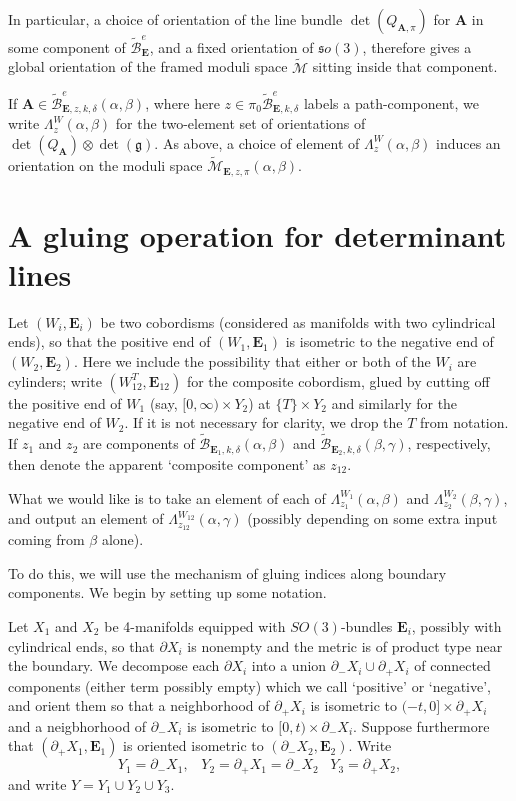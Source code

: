\documentclass{memo-l}
\theoremstyle{definition}
\theoremstyle{remark}
\numberwithin{section}{chapter}
\numberwithin{equation}{chapter}
\begin{document}
In particular, a choice of orientation of the line bundle $\det(Q_{\mathbf{A},\pi})$ for $\mathbf{A}$ in some component of $\widetilde{\mathcal B}^e_{\mathbf{E}}$, and a fixed orientation of $\mathfrak so(3)$, therefore gives a global orientation of the framed moduli space $\widetilde{\mathcal M}$ sitting inside that component.

If $\mathbf{A} \in \widetilde{\mathcal B}^e_{\mathbf{E},z,k,\delta}(\alpha, \beta)$, where here $z \in \pi_0 \widetilde{\mathcal B}^e_{\mathbf{E}, k, \delta}$ labels a path-component, we write $\Lambda^W_z(\alpha, \beta)$ for the two-element set of orientations of $\det(Q_{\mathbf{A}}) \otimes \det(\mathfrak g)$. As above, a choice of element of $\Lambda^W_z(\alpha, \beta)$ induces an orientation on the moduli space $\widetilde{\mathcal M}_{\mathbf{E},z,\pi}(\alpha, \beta)$.

\section{A gluing operation for determinant lines}\label{sec:or-gluing1}
Let $(W_i, \mathbf{E}_i)$ be two cobordisms (considered as manifolds with two cylindrical ends), so that the positive end of $(W_1,\mathbf{E}_1)$ is isometric to the negative end of $(W_2,\mathbf{E}_2)$. Here we include the possibility that either or both of the $W_i$ are cylinders; write $(W_{12}^T, \mathbf{E}_{12})$ for the composite cobordism, glued by cutting off the positive end of $W_1$ (say, $[0, \infty) \times Y_2$) at $\{T\} \times Y_2$ and similarly for the negative end of $W_2$. If it is not necessary for clarity, we drop the $T$ from notation. If $z_1$ and $z_2$ are components of $\widetilde{\mathcal B}_{\mathbf{E}_1, k, \delta}(\alpha, \beta)$ and $\widetilde{\mathcal B}_{\mathbf{E}_2, k, \delta}(\beta, \gamma)$, respectively, then denote the apparent `composite component' as $z_{12}$. 

What we would like is to take an element of each of $\Lambda^{W_1}_{z_1}(\alpha, \beta)$ and $\Lambda^{W_2}_{z_2}(\beta, \gamma)$, and output an element of $\Lambda^{W_{12}}_{z_{12}}(\alpha, \gamma)$ (possibly depending on some extra input coming from $\beta$ alone).

To do this, we will use the mechanism of gluing indices along boundary components. We begin by setting up some notation.

Let $X_1$ and $X_2$ be 4-manifolds equipped with $SO(3)$-bundles $\mathbf{E}_i$, possibly with cylindrical ends, so that $\partial X_i$ is nonempty and the metric is of product type near the boundary. We decompose each $\partial X_i$ into a union $\partial_- X_i \cup \partial_+ X_i$ of connected components (either term possibly empty) which we call `positive' or `negative', and orient them so that a neighborhood of $\partial_+ X_i$ is isometric to $(-t, 0] \times \partial_+ X_i$ and a neigbhorhood of $\partial_- X_i$ is isometric to $[0,t) \times \partial_- X_i$. Suppose furthermore that $(\partial_+ X_1, \mathbf{E}_1)$ is oriented isometric to $(\partial_- X_2, \mathbf{E}_2)$. Write $$Y_1 = \partial_- X_1, \;\;\; Y_2 = \partial_+ X_1 = \partial_- X_2 \;\;\; Y_3 = \partial_+ X_2,$$ and write $Y = Y_1 \cup Y_2 \cup Y_3$.
\end{document}
